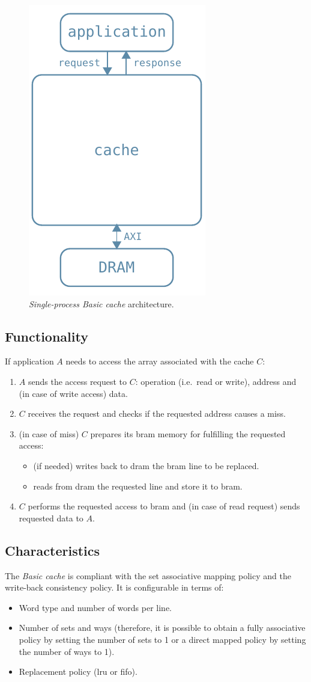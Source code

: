 \documentclass[11pt,a4paper,oneside]{memoir}
\begin{document}
\begin{figure}[!htb]
	\centering
	\includegraphics[width=.3\textwidth]{single_proc_basic_arch}
	\caption{\emph{Single-process Basic cache} architecture.}
	\label{fig:single_proc_basic_arch}
\end{figure}

\subsection{Functionality}
If application $A$ needs to access the array associated with the cache $C$:
\begin{enumerate}
	\item $A$ sends the access request to $C$: operation (i.e.\ read or
		write), address and (in case of write access) data.
	\item $C$ receives the request and checks if the requested address
		causes a miss.
	\item (in case of miss) $C$ prepares its \ac{bram} memory for fulfilling
		the requested access:
		\begin{itemize}
			\item (if needed) writes back to \ac{dram} the \ac{bram}
				line to be replaced.
			\item reads from \ac{dram} the requested line and store
				it to \ac{bram}.
		\end{itemize}
	\item $C$ performs the requested access to \ac{bram} and (in case of
		read request) sends requested data to $A$.
\end{enumerate}

\subsection{Characteristics}
The \emph{Basic cache} is compliant with the set associative mapping policy and
the write-back consistency policy.
It is configurable in terms of:
\begin{itemize}
	\item Word type and number of words per line.
	\item Number of sets and ways (therefore, it is possible to obtain a
		fully associative policy by setting the number of sets to 1 or
		a direct mapped policy by setting the number of ways to 1).
	\item Replacement policy (\acl{lru} or \acl{fifo}).
\end{itemize}
\end{document}
